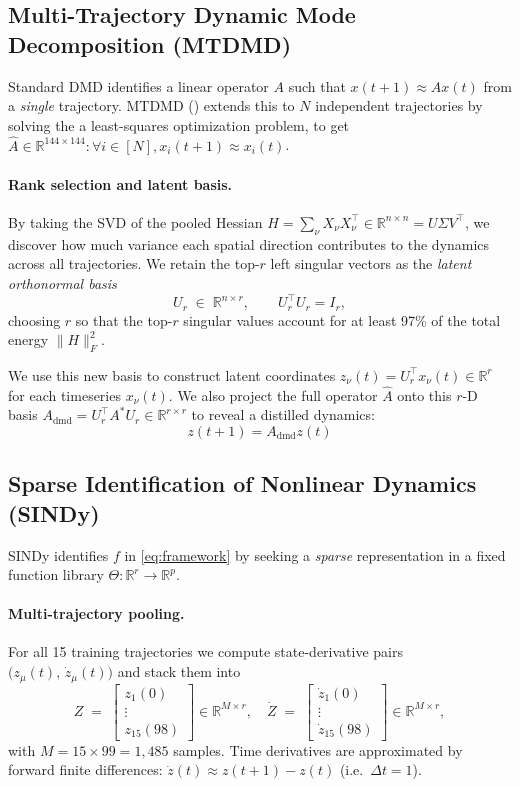 \documentclass[11pt]{article}
\begin{document}
\subsection{Multi-Trajectory Dynamic Mode Decomposition (MTDMD)}
\label{sec:mtdmd}

Standard DMD identifies a linear operator $A$ such that $x(t+1) \approx Ax(t)$
from a \emph{single} trajectory.  MTDMD (\cite{anzaki2024}) extends this to $N$
independent trajectories by solving the a least-squares optimization problem, to get
$\hat{A} \in \mathbb{R}^{144 \times 144} : \forall i \in [N], x_i(t+1) \approx x_i(t)$.

\paragraph{Rank selection and latent basis.}
By taking the SVD of the pooled Hessian $H = \sum_\nu X_\nu X_\nu^\top \in \mathbb{R}^{n\times n} = U\Sigma V^\top$,
we discover how much variance each spatial direction contributes to the dynamics across all trajectories.
We retain the top-$r$ left singular vectors as the \textit{latent orthonormal basis}
\[
  U_r \;\in\; \mathbb{R}^{n \times r},\qquad U_r^\top U_r = I_r,
\]
choosing $r$ so that the top-$r$ singular values account for at least 97\% of
the total energy $\|H\|_F^2$.

We use this new basis to construct latent coordinates  $z_\nu(t) = U_r^\top x_\nu(t) \in \mathbb{R}^r$ for each timeseries $x_\nu(t)$.
We also project the full operator $\hat{A}$ onto this $r$-D basis $A_{\mathrm{dmd}} = U_r^\top A^* U_r \in \mathbb{R}^{r\times r}$ to reveal
a distilled dynamics:
$$z(t+1) = A_{\mathrm{dmd}} z(t)$$

\subsection{Sparse Identification of Nonlinear Dynamics (SINDy)}
\label{sec:sindy}

SINDy \cite{brunton2016} identifies $f$ in \eqref{eq:framework} by seeking a
\emph{sparse} representation in a fixed function library
$\Theta : \mathbb{R}^r \to \mathbb{R}^p$.

\paragraph{Multi-trajectory pooling.}
For all 15 training trajectories we compute state-derivative pairs
$\bigl(z_\mu(t),\, \dot{z}_\mu(t)\bigr)$ and stack them into
\[
  Z \;=\; \begin{bmatrix} z_1(0)\\ \vdots \\ z_{15}(98) \end{bmatrix}
  \in \mathbb{R}^{M\times r},\quad
  \dot{Z} \;=\; \begin{bmatrix} \dot{z}_1(0)\\ \vdots \\ \dot{z}_{15}(98) \end{bmatrix}
  \in \mathbb{R}^{M\times r},
\]
with $M = 15 \times 99 = 1{,}485$ samples.  Time derivatives are approximated
by forward finite differences: $\dot{z}(t) \approx z(t+1) - z(t)$ (i.e.\ $\Delta t = 1$).
\end{document}
